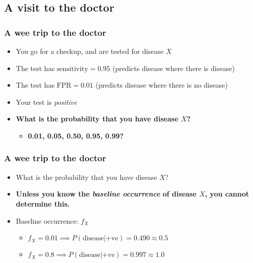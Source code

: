 
\subsection{A visit to the doctor}

\begin{frame}
  \frametitle{A wee trip to the doctor}
  \begin{itemize}
    \item<1-> You go for a checkup, and are tested for disease $X$
    \item<1-> The test has \textbf{$\text{sensitivity}=0.95$} (predicts disease where there is disease)
    \item<1-> The test has \textbf{$\text{FPR}=0.01$} (predicts disease where there is no disease)
    \item<2-> Your test is \emph{positive}
    \item<2-> \textbf{What is the probability that you have disease $X$?}
    \begin{itemize}
      \item \textbf{0.01, 0.05, 0.50, 0.95, 0.99?}
    \end{itemize}
  \end{itemize} 
\end{frame}

\begin{frame}
  \frametitle{A wee trip to the doctor}
  \begin{itemize}
    \item<1-> What is the probability that you have disease $X$?
    \item<1-> \textbf{Unless you know the \emph{baseline occurrence} of disease $X$, you cannot determine this.}
    \item<2-> Baseline occurrence: $f_X$
    \begin{itemize}
      \item $f_X = 0.01 \implies P(\text{disease}|\text{+ve}) = 0.490 \approx 0.5$
      \item $f_X = 0.8 \implies P(\text{disease}|\text{+ve}) = 0.997 \approx 1.0$         
    \end{itemize}
  \end{itemize} 
\end{frame}



